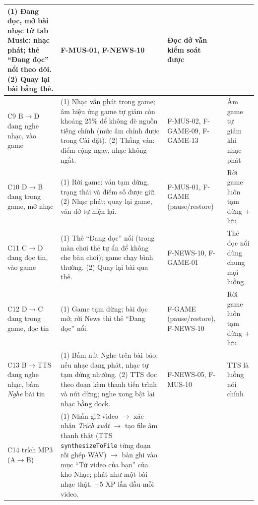 \begin{longtable}{>{\raggedright\arraybackslash}p{1.5cm} >{\raggedright\arraybackslash}p{8.6cm} >{\raggedright\arraybackslash}p{2.5cm} >{\raggedright\arraybackslash}p{2.6cm}}
(1) Đang đọc, mở bài nhạc từ tab Music: nhạc phát; thẻ ``Đang đọc'' nổi theo dõi. \newline
(2) Quay lại bài bằng thẻ. &
F-MUS-01, F-NEWS-10 &
Đọc dở vẫn kiểm soát được \\
\midrule
C9 \newline B$\rightarrow$D \newline đang nghe nhạc, vào game &
(1) Nhạc vẫn phát trong game; âm hiệu ứng game tự giảm còn khoảng 25\% để không đè nguồn tiếng chính (mức âm chỉnh được trong Cài đặt). \newline
(2) Thắng ván: điểm cộng ngay, nhạc không ngắt. &
F-MUS-02, F-GAME-09, F-GAME-13 &
Âm game tự giảm khi nhạc phát \\
\midrule
C10 \newline D$\rightarrow$B \newline đang trong game, mở nhạc &
(1) Rời game: ván tạm dừng, trạng thái và điểm số được giữ. \newline
(2) Nhạc phát; quay lại game, ván dở tự hiện lại. &
F-MUS-01, F-GAME (pause/restore) &
Rời game luôn tạm dừng + lưu \\
\midrule
C11 \newline C$\rightarrow$D \newline đang đọc tin, vào game &
(1) Thẻ ``Đang đọc'' nổi (trong màn chơi thẻ tự ẩn để không che bàn chơi); game chạy bình thường. \newline
(2) Quay lại bài qua thẻ. &
F-NEWS-10, F-GAME-01 &
Thẻ đọc nổi dùng chung mọi luồng \\
\midrule
C12 \newline D$\rightarrow$C \newline đang trong game, đọc tin &
(1) Game tạm dừng; bài đọc mở; rời News thì thẻ ``Đang đọc'' nổi. &
F-GAME (pause/restore), F-NEWS-10 &
Rời game luôn tạm dừng + lưu \\
\midrule
C13 \newline B$\rightarrow$TTS \newline đang nghe nhạc, bấm \textit{Nghe} bài tin &
(1) Bấm nút Nghe trên bài báo: nếu nhạc đang phát, nhạc tự tạm dừng nhường. \newline
(2) TTS đọc theo đoạn kèm thanh tiến trình và nút dừng; nghe xong bật lại nhạc bằng dock. &
F-NEWS-05, F-MUS-10 &
TTS là luồng nói chính \\
\midrule
C14 \newline trích MP3 \newline (A$\rightarrow$B) &
(1) Nhấn giữ video $\rightarrow$ xác nhận \textit{Trích xuất} $\rightarrow$ tạo file âm thanh thật (TTS \texttt{synthesizeToFile} từng đoạn rồi ghép WAV) $\rightarrow$ bản ghi vào mục ``Từ video của bạn'' của kho Nhạc; phát như một bài nhạc thật, +5 XP lần đầu mỗi video. \newline

\end{longtable}
